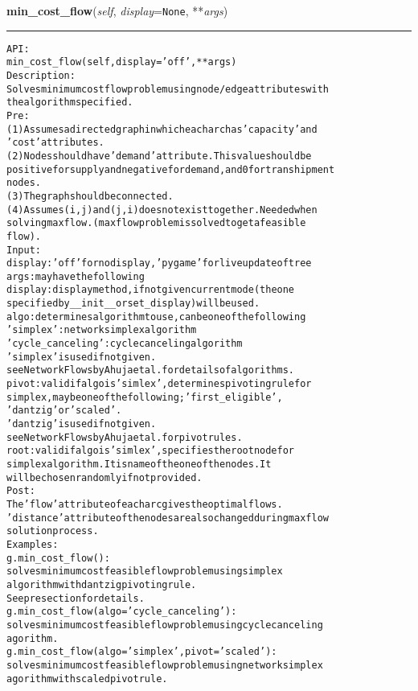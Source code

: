 \hspace{.8\funcindent}\begin{boxedminipage}{\funcwidth}

    \raggedright \textbf{min\_cost\_flow}(\textit{self}, \textit{display}={\tt None}, **\textit{args})

    \vspace{-1.5ex}

    \rule{\textwidth}{0.5\fboxrule}
\setlength{\parskip}{2ex}
\begin{alltt}

API:
    min\_cost\_flow(self, display='off', **args)
Description:
    Solves minimum cost flow problem using node/edge attributes with
    the algorithm specified.
Pre:
    (1) Assumes a directed graph in which each arc has 'capacity' and
    'cost' attributes.
    (2) Nodes should have 'demand' attribute. This value should be
    positive for supply and negative for demand, and 0 for transhipment
    nodes.
    (3) The graph should be connected.
    (4) Assumes (i,j) and (j,i) does not exist together. Needed when
    solving max flow. (max flow problem is solved to get a feasible
    flow).
Input:
    display: 'off' for no display, 'pygame' for live update of tree
    args: may have the following
        display: display method, if not given current mode (the one
            specified by \_\_init\_\_ or set\_display) will be used.
        algo: determines algorithm to use, can be one of the following
            'simplex': network simplex algorithm
            'cycle\_canceling': cycle canceling algorithm
            'simplex' is used if not given.
            see Network Flows by Ahuja et al. for details of algorithms.
        pivot: valid if algo is 'simlex', determines pivoting rule for
            simplex, may be one of the following; 'first\_eligible',
            'dantzig' or 'scaled'.
            'dantzig' is used if not given.
            see Network Flows by Ahuja et al. for pivot rules.
        root: valid if algo is 'simlex', specifies the root node for
            simplex algorithm. It is name of the one of the nodes. It
            will be chosen randomly if not provided.
Post:
    The 'flow' attribute of each arc gives the optimal flows.
    'distance' attribute of the nodes are also changed during max flow
    solution process.
Examples:
    g.min\_cost\_flow():
        solves minimum cost feasible flow problem using simplex
        algorithm with dantzig pivoting rule.
        See pre section for details.
    g.min\_cost\_flow(algo='cycle\_canceling'):
        solves minimum cost feasible flow problem using cycle canceling
        agorithm.
    g.min\_cost\_flow(algo='simplex', pivot='scaled'):
        solves minimum cost feasible flow problem using network simplex
        agorithm with scaled pivot rule.
\end{alltt}

\setlength{\parskip}{1ex}
    \end{boxedminipage}

